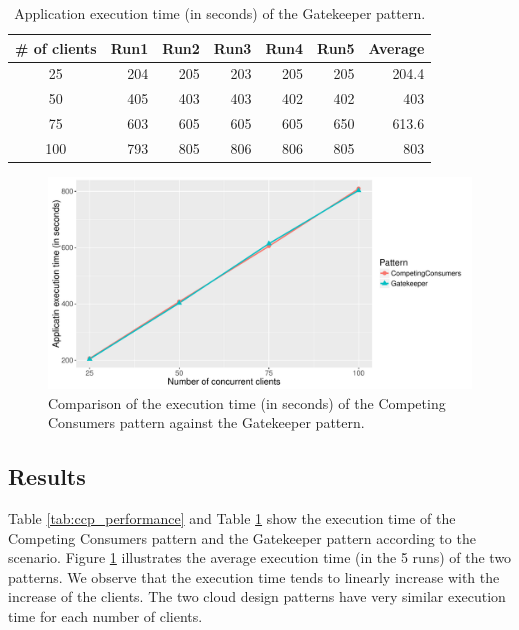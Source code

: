 \documentclass{article}
\begin{document}
\begin{table}[!]
    \centering
    \caption{Application execution time (in seconds) of the Gatekeeper pattern.}
    \label{tab:gatekeeper_performance}
    \begin{tabular}{|c|r|r|r|r|r|r|}
        \hline
        \textbf{\# of clients} & \textbf{Run1} & \textbf{Run2} & \textbf{Run3} & \textbf{Run4} & \textbf{Run5} & \textbf{Average}\\ \hline
        25 & 204 & 205 & 203 & 205 & 205 & 204.4 \\ \hline 
        50 & 405 & 403 & 403 & 402 & 402 & 403 \\ \hline
        75 & 603 & 605 & 605 & 605 & 650 & 613.6 \\ \hline
        100 & 793 & 805 & 806 & 806 & 805 & 803 \\ \hline
	\end{tabular}
\end{table}

\begin{figure}[t]
    \centering
        \includegraphics[width = \columnwidth]{images/performance.pdf}
    \caption{Comparison of the execution time (in seconds) of the Competing Consumers pattern against the Gatekeeper pattern.}
    \label{fig:performance}
\end{figure}


\subsection{Results}
Table \ref{tab:ccp_performance} and Table \ref{tab:gatekeeper_performance} show the execution time of the Competing Consumers pattern and the Gatekeeper pattern according to the scenario. Figure \ref{fig:performance} illustrates the average execution time (in the 5 runs) of the two patterns. We observe that the execution time tends to linearly increase with the increase of the clients. The two cloud design patterns have very similar execution time for each number of clients.\\
\end{document}
